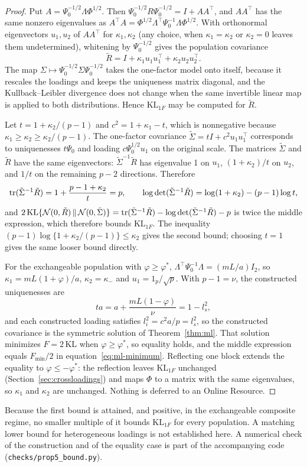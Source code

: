 \begin{proof}
Put $A=\Psi_0^{-1/2}\Lambda\Phi^{1/2}$. Then $\Psi_0^{-1/2}R\Psi_0^{-1/2}=I+AA^\top$, and $AA^\top$ has the same nonzero eigenvalues as $A^\top A=\Phi^{1/2}\Lambda^\top\Psi_0^{-1}\Lambda\Phi^{1/2}$. With orthonormal eigenvectors $u_1,u_2$ of $AA^\top$ for $\kappa_1,\kappa_2$ (any choice, when $\kappa_1=\kappa_2$ or $\kappa_2=0$ leaves them undetermined), whitening by $\Psi_0^{-1/2}$ gives the population covariance
\[
\tilde R=I+\kappa_1u_1u_1^\top+\kappa_2u_2u_2^\top.
\]
The map $\Sigma\mapsto\Psi_0^{-1/2}\Sigma\Psi_0^{-1/2}$ takes the one-factor model onto itself, because it rescales the loadings and keeps the uniqueness matrix diagonal, and the Kullback--Leibler divergence does not change when the same invertible linear map is applied to both distributions. Hence $\mathrm{KL}_{1F}$ may be computed for $\tilde R$.

Let $t=1+\kappa_2/(p-1)$ and $c^2=1+\kappa_1-t$, which is nonnegative because $\kappa_1\ge\kappa_2\ge\kappa_2/(p-1)$. The one-factor covariance $\tilde\Sigma=tI+c^2u_1u_1^\top$ corresponds to uniquenesses $t\Psi_0$ and loading $c\Psi_0^{1/2}u_1$ on the original scale. The matrices $\tilde\Sigma$ and $\tilde R$ have the same eigenvectors: $\tilde\Sigma^{-1}\tilde R$ has eigenvalue 1 on $u_1$, $(1+\kappa_2)/t$ on $u_2$, and $1/t$ on the remaining $p-2$ directions. Therefore
\[
\operatorname{tr}(\tilde\Sigma^{-1}\tilde R)=1+\frac{p-1+\kappa_2}{t}=p,
\qquad
\log\det(\tilde\Sigma^{-1}\tilde R)=\log(1+\kappa_2)-(p-1)\log t,
\]
and $2\,\mathrm{KL}\{\mathcal N(0,\tilde R)\,\|\,\mathcal N(0,\tilde\Sigma)\}=\operatorname{tr}(\tilde\Sigma^{-1}\tilde R)-\log\det(\tilde\Sigma^{-1}\tilde R)-p$ is twice the middle expression, which therefore bounds $\mathrm{KL}_{1F}$. The inequality $(p-1)\log\{1+\kappa_2/(p-1)\}\le\kappa_2$ gives the second bound; choosing $t=1$ gives the same looser bound directly.

For the exchangeable population with $\varphi\ge\varphi^*$, $\Lambda^\top\Psi_0^{-1}\Lambda=(mL/a)I_2$, so $\kappa_1=mL(1+\varphi)/a$, $\kappa_2=\kappa_-$ and $u_1=1_p/\sqrt p$. With $p-1=\nu$, the constructed uniquenesses are
\[
ta=a+\frac{mL(1-\varphi)}{\nu}=1-l_s^2,
\]
and each constructed loading satisfies $l_i^2=c^2a/p=l_s^2$, so the constructed covariance is the symmetric solution of Theorem~\ref{thm:ml}. That solution minimizes $F=2\,\mathrm{KL}$ when $\varphi\ge\varphi^*$, so equality holds, and the middle expression equals $F_{\min}/2$ in equation~\eqref{eq:ml-minimum}. Reflecting one block extends the equality to $\varphi\le-\varphi^*$: the reflection leaves $\mathrm{KL}_{1F}$ unchanged (Section~\ref{sec:crossloadings}) and maps $\Phi$ to a matrix with the same eigenvalues, so $\kappa_1$ and $\kappa_2$ are unchanged. Nothing is deferred to an Online Resource.
\end{proof}

Because the first bound is attained, and positive, in the exchangeable composite regime, no smaller multiple of it bounds $\mathrm{KL}_{1F}$ for every population. A matching lower bound for heterogeneous loadings is not established here. A numerical check of the construction and of the equality case is part of the accompanying code (\texttt{checks/prop5\_bound.py}).

